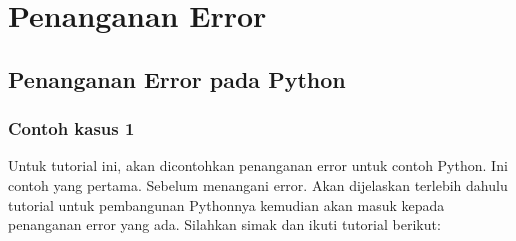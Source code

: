 \section{Penanganan Error}

\subsection{Penanganan Error pada Python}

\subsubsection{Contoh kasus 1}
Untuk tutorial ini, akan dicontohkan penanganan error untuk contoh Python. Ini contoh yang pertama. Sebelum menangani error. Akan dijelaskan terlebih dahulu tutorial untuk pembangunan Pythonnya kemudian akan masuk kepada penanganan error yang ada. Silahkan simak dan ikuti tutorial berikut:
